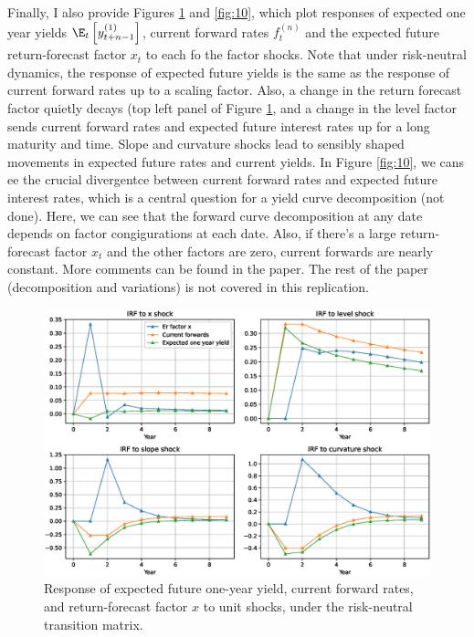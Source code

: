 Finally, I also provide Figures \ref{fig:9} and \ref{fig:10}, which plot responses of expected one year yields $\E_t\left[y_{t+n-1}^{(1)}\right]$, current forward rates $f_t^{(n)}$ and the expected future return-forecast factor $x_t$ to each fo the factor shocks. Note that under risk-neutral dynamics, the response of expected future yields is the same as the response of current forward rates up to a scaling factor. Also, a change in the return forecast factor quietly decays (top left panel of Figure \ref{fig:9}, and a change in the level factor sends current forward rates and expected future interest rates up for a long maturity and time. Slope and curvature shocks lead to sensibly shaped movements in expected future rates and current yields. In Figure \ref{fig:10}, we cans ee the crucial divergentce between current forward rates and expected future interest rates, which is a central question for a yield curve decomposition (not done). Here, we can see that the forward curve decomposition  at any date depends on factor congigurations at each date. Also, if there's a large return-forecast factor $x_t$ and the other factors are zero, current forwards are nearly constant. More comments can be found in the paper. The rest of the paper (decomposition and variations) is not covered in this replication.
\begin{figure}[h!]
	\centering
	\caption{Response of expected future one-year yield, current forward rates, and return-forecast factor $x$ to unit shocks, under the risk-neutral transition matrix.}\label{fig:9}
	\includegraphics[scale=0.5]{fig/eps/Figure9.eps}
\end{figure}


